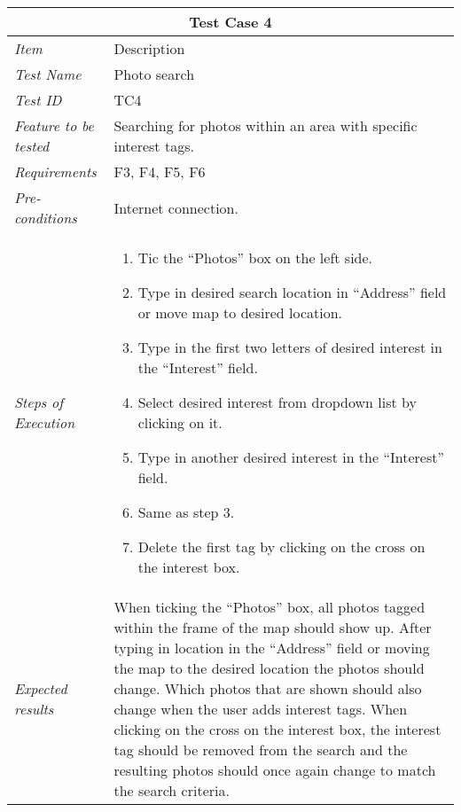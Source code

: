 \begin{minipage}{\linewidth}
\setlength{\tabcolsep}{15pt}
\centering
{}
\begin{tabular}{ |l|p{70mm}| }
	\hline
	\multicolumn{2}{|c|}{\cellcolor{gray!25} \textbf{Test Case 4}} \\
	\hline
	\it{\cellcolor{gray!25}Item} & {\cellcolor{gray!25} Description } \\
	\hline
	\it{\cellcolor{gray!25}Test Name } & Photo search \\ \hline
	\it{\cellcolor{gray!25}Test ID} & TC4 \\ \hline
	\it{\cellcolor{gray!25}Feature to be tested} & Searching for photos within an area with specific interest tags. \\ \hline
	\it{\cellcolor{gray!25}Requirements} & F3, F4, F5, F6  \\ \hline
	\it{\cellcolor{gray!25}Pre-conditions} & Internet connection. \\ \hline
	\it{\cellcolor{gray!25}Steps of Execution} & \begin{enumerate}
	                                       \item Tic the “Photos” box on the left side.
	                                       \item Type in desired search location in “Address” field or move map to desired location.
	                                       \item Type in the first two letters of desired interest in the “Interest” field.
	                                       \item Select desired interest from dropdown list by clicking on it.
	                                       \item Type in another desired interest in the “Interest” field.
	                                       \item Same as step 3.
	                                       \item Delete the first tag by clicking on the cross on the interest box.
	                                     \end{enumerate} \\ \hline
	\it{\cellcolor{gray!25}Expected results} & When ticking the “Photos” box, all photos tagged within the frame of the map should show up. After typing in location in the “Address” field or moving the map to the desired location the photos should change. Which photos that are shown should also change when the user adds interest tags. When clicking on the cross on the interest box, the interest tag should be removed from the search and the resulting photos should once again change to match the search criteria. \\
	\hline
\end{tabular}
\medskip
\end{minipage}
